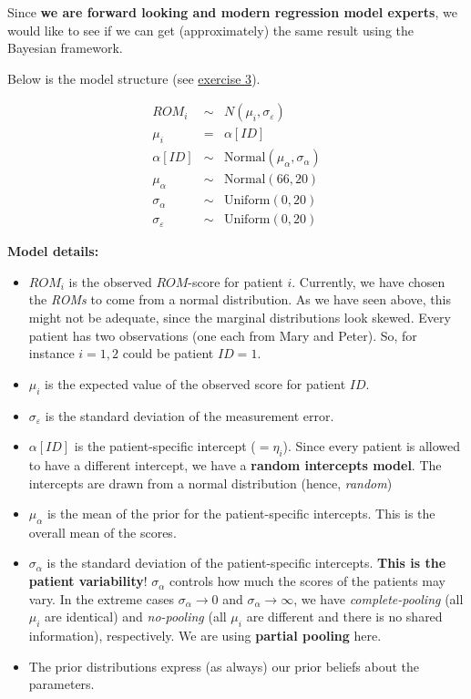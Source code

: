 \documentclass[
]{article}
\providecommand{\tightlist}{%
  \setlength{\itemsep}{0pt}\setlength{\parskip}{0pt}}
\begin{document}
Since \textbf{we are forward looking and modern regression model experts},
we would like to see if we can get (approximately) the same result using the Bayesian
framework.

Below is the model structure (see \hyperref[exercise3]{exercise 3}).

\[
\begin{array}{rcl}
ROM_i &\sim& N(\mu_i, \sigma_{\varepsilon}) \\
\mu_i &=& \alpha[ID] \\
\alpha[ID] &\sim& \text{Normal}(\mu_{\alpha}, \sigma_{\alpha}) \\
\mu_{\alpha} &\sim& \text{Normal}(66, 20) \\
\sigma_{\alpha} &\sim& \text{Uniform}(0,20) \\
\sigma_{\varepsilon} &\sim& \text{Uniform}(0,20)
\end{array}
\]

\textbf{Model details:}

\begin{itemize}
\tightlist
\item
  \(ROM_i\) is the observed \(ROM\)-score for patient \(i\). Currently, we have chosen the \emph{ROMs} to
  come from a normal distribution. As we have seen above, this might not be adequate,
  since the marginal distributions look skewed.
  Every patient has two observations (one each from Mary and Peter).
  So, for instance \(i=1,2\) could be patient \(ID=1\).
\item
  \(\mu_i\) is the expected value of the observed score for patient \(ID\).
\item
  \(\sigma_{\varepsilon}\) is the standard deviation of the measurement error.
\item
  \(\alpha[ID]\) is the patient-specific intercept (\(=\eta_i\)).
  Since every patient is allowed to have a different intercept,
  we have a \textbf{random intercepts model}.
  The intercepts are drawn from a normal distribution (hence, \emph{random})
\item
  \(\mu_{\alpha}\) is the mean of the prior for the patient-specific intercepts.
  This is the overall mean of the scores.
\item
  \(\sigma_{\alpha}\) is the standard deviation of the patient-specific intercepts.
  \textbf{This is the patient variability}! \(\sigma_{\alpha}\) controls how much
  the scores of the patients may vary.
  In the extreme cases \(\sigma_{\alpha} \rightarrow 0\) and \(\sigma_{\alpha} \rightarrow \infty\),
  we have \emph{complete-pooling} (all \(\mu_i\) are identical) and \emph{no-pooling}
  (all \(\mu_i\) are different and there is no shared information), respectively.
  We are using \textbf{partial pooling} here.
\item
  The prior distributions express (as always) our prior beliefs about the parameters.
\end{itemize}
\end{document}
